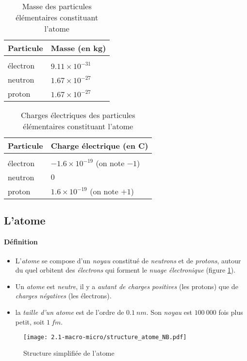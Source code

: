 \begin{table}[!h]
  \centering
  \begin{tabu} to 0.95\columnwidth { X[l] X[l] }
      \hline 
      \textbf{Particule} & \textbf{Masse  (en $\bm{kg} $)} \\ 
      \hline \\[-10pt]
	électron & $9.11 \times 10^{-31}$ \\ 
	neutron  & $1.67 \times 10^{-27}$ \\ 
	proton   & $1.67 \times 10^{-27}$ \\ 
      \hline      
  \end{tabu}
  \caption{Masse des particules élémentaires constituant l'atome}
  \label{tab:masse-particules-elementaires}
\end{table}

\begin{table}[!h]
  \centering
  \begin{tabu} to 0.95\columnwidth { X[l] X[2,l] }
      \hline 
      \textbf{Particule} & \textbf{Charge électrique   (en $\bm{C} $)} \\
      \hline \\[-10pt]
	électron & $-1.6 \times 10^{-19}$ (on note $-1$)\\ 
	neutron  & $0$ \\ 
	proton   & $1.6 \times 10^{-19}$ (on note $+1$)\\ 
      \hline      
  \end{tabu}
  \caption{Charges électriques des particules élémentaires constituant l'atome}
  \label{tab:charge-particules-elementaires}
\end{table}

\subsection{L'atome}
\paragraph{Définition}
\begin{itemize}
  \item L'\textit{atome} se compose d'un \textit{noyau} constitué de \textit{neutrons} et de \textit{protons}, 
  autour du quel orbitent des \textit{électrons} qui forment le \textit{nuage électronique}
  (figure \ref{fig:atome}).  
  \item Un \textit{atome} est \textit{neutre}, il y a \textit{autant de charges positives} (les protons) que 
  de \textit{charges négatives} (les électrons).
  \item la \textit{taille d'un atome} est de l'ordre de $0.1~nm$. Son \textit{noyau} est $100~000$ fois plus petit,
soit $1~fm$.
\end{itemize}
\begin{figure}[!h]
    \begin{center}
	\texttt{[image: 2.1-macro-micro/structure\_atome\_NB.pdf]}
    \end{center}
    \caption{Structure simplifiée de l'atome}
    \label{fig:atome}
  \end{figure}


